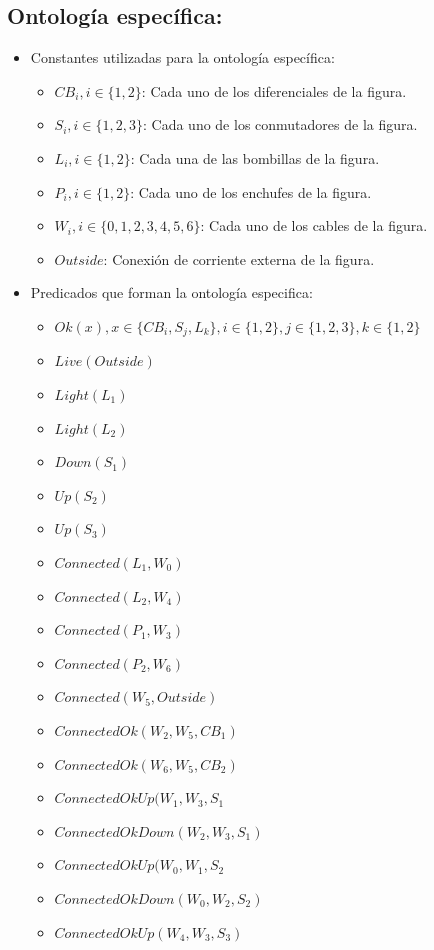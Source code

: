 \documentclass[10pt, a4paper,spanish]{article}
\begin{document}
		\subsection{Ontología específica:}

			\begin{itemize}
				\item Constantes utilizadas para la ontología específica:
				\begin{itemize}
					\item $CB_i, i \in \{1,2\}$: Cada uno de los diferenciales de la figura.
					\item $S_i, i \in \{1,2,3\}$:  Cada uno de los conmutadores de la figura.
					\item $L_i, i \in \{1,2\}$: Cada una de las bombillas de la figura.
					\item $P_i, i \in \{1,2\}$: Cada uno de los enchufes de la figura.
					\item $W_i, i \in \{0,1,2,3,4,5,6\}$: Cada uno de los cables de la figura.
					\item $Outside$: Conexión de corriente externa de la figura.
				\end{itemize}
				\item Predicados que forman la ontología especifica:
				\begin{itemize}
				 	\item $ Ok(x),  x \in \{CB_i, S_j, L_k\}, i \in \{1,2\}, j \in \{1,2,3\},k \in \{1,2\}$
					\item $ Live(Outside)$
					\item $ Light(L_1)$
					\item $ Light(L_2)$
					\item $ Down(S_1)$
					\item $ Up(S_2)$
					\item $ Up(S_3)$
					\item $ Connected(L_1, W_0)$
					\item $ Connected(L_2, W_4)$
					\item $ Connected(P_1, W_3)$
					\item $ Connected(P_2, W_6)$
					\item $ Connected(W_5, Outside)$


					\item $ ConnectedOk(W_2, W_5, CB_1)$
					\item $ ConnectedOk(W_6, W_5, CB_2)$

					\item $ ConnectedOkUp(W_1, W_3, S_1$
					\item $ ConnectedOkDown(W_2, W_3, S_1)$

					\item $ ConnectedOkUp(W_0, W_1, S_2$
					\item $ ConnectedOkDown(W_0, W_2, S_2)$


					\item $ ConnectedOkUp(W_4, W_3, S_3)$
				\end{itemize}

			\end{itemize}
\end{document}
